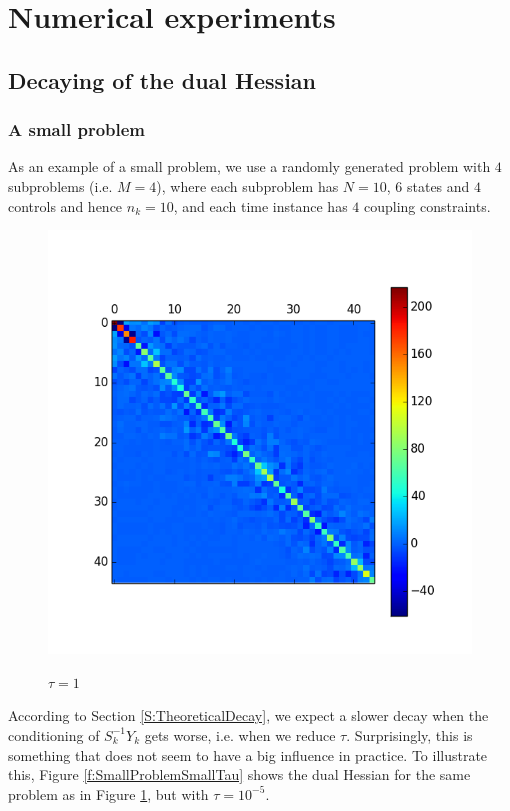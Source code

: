 \section{Numerical experiments}

\subsection{Decaying of the dual Hessian}

\subsubsection{A small problem}

As an example of a small problem, we use a randomly generated problem with $4$ subproblems (i.e. $M=4$), where each subproblem has $N = 10$, $6$ states and $4$ controls and hence $n_k = 10$, and each time instance has $4$ coupling constraints.

\begin{figure}[h]
  \centering
  \includegraphics[scale = 0.5]{./Figures/SmallProblemLargeTau.png}\\
  \caption{$\tau = 1$}
  \label{f:SmallProblemLargeTau}
\end{figure}

According to Section \ref{S:TheoreticalDecay}, we expect a slower decay when the conditioning of $S_k^{-1}Y_k$ gets worse, i.e. when we reduce $\tau$. Surprisingly, this is something that does not seem to have a big influence in practice. To illustrate this, Figure \ref{f:SmallProblemSmallTau} shows the dual Hessian for the same problem as in Figure \ref{f:SmallProblemLargeTau}, but with $\tau=10^{-5}$.

